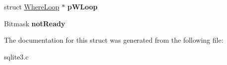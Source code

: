 \begin{DoxyCompactItemize}
\begin{tabbing}
\end{tabbing}\item 
struct \hyperlink{structWhereLoop}{Where\+Loop} $\ast$ {\bfseries p\+W\+Loop}\hypertarget{structWhereLevel_ac40ed0531ae966eabe77e10f29fb56f3}{}\label{structWhereLevel_ac40ed0531ae966eabe77e10f29fb56f3}

\item 
Bitmask {\bfseries not\+Ready}\hypertarget{structWhereLevel_aed1e0964182444c84ceaad061acc473c}{}\label{structWhereLevel_aed1e0964182444c84ceaad061acc473c}

\end{DoxyCompactItemize}


The documentation for this struct was generated from the following file\+:\begin{DoxyCompactItemize}
\item 
sqlite3.\+c\end{DoxyCompactItemize}
